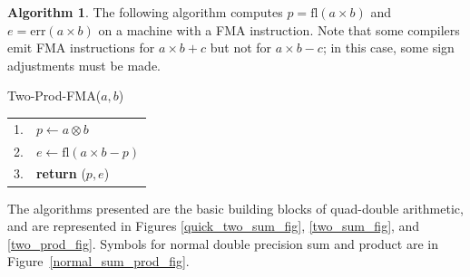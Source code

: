 \documentclass[11pt]{article}
\theoremstyle{definition}
\newtheorem{alg}[thm]{Algorithm}
\newcommand{\fl}{\mathrm{fl}}
\newcommand{\err}{\mathrm{err}}
\begin{document}
\begin{alg}
  The following algorithm computes $p = \fl(a \times b)$ and 
  $e = \err(a \times b)$ on a machine with a FMA instruction.
  Note that some compilers emit FMA instructions for
  $a \times b + c$ but not for $a \times b - c$; in this case, some
  sign adjustments must be made.
  
  \vspace{0.1in} \hfill
  \begin{minipage}[t]{4in}
    {\sc Two-Prod-FMA}($a, b$) \\
    \begin{tabular}{rl}
      1. & $p \leftarrow a \otimes b$ \\
      2. & $e \leftarrow \fl(a \times b - p)$ \\
      3. & {\bf return} ($p, e$)
    \end{tabular}
  \end{minipage}
\end{alg}

The algorithms presented are the basic building blocks of quad-double
arithmetic, and are represented in Figures \ref{quick_two_sum_fig}, 
\ref{two_sum_fig}, and \ref{two_prod_fig}.  Symbols for normal 
double precision sum and product are in Figure~\ref{normal_sum_prod_fig}.
\end{document}
